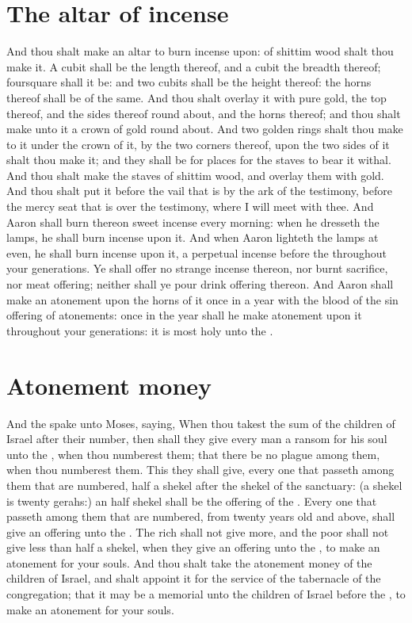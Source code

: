 \section*{The altar of incense}
\begin{biblechapter} %
\verse And thou shalt make an altar to burn incense upon: of shittim wood shalt thou make it.
\verse A cubit shall be the length thereof, and a cubit the breadth thereof; foursquare shall it be: and two cubits shall be the height thereof: the horns thereof shall be of the same.
\verse And thou shalt overlay it with pure gold, the top thereof, and the sides thereof round about, and the horns thereof; and thou shalt make unto it a crown of gold round about.
\verse And two golden rings shalt thou make to it under the crown of it, by the two corners thereof, upon the two sides of it shalt thou make it; and they shall be for places for the staves to bear it withal.
\verse And thou shalt make the staves of shittim wood, and overlay them with gold.
\verse And thou shalt put it before the vail that is by the ark of the testimony, before the mercy seat that is over the testimony, where I will meet with thee.
\verse And Aaron shall burn thereon sweet incense every morning: when he dresseth the lamps, he shall burn incense upon it.
\verse And when Aaron lighteth the lamps at even, he shall burn incense upon it, a perpetual incense before the \LORD throughout your generations.
\verse Ye shall offer no strange incense thereon, nor burnt sacrifice, nor meat offering; neither shall ye pour drink offering thereon.
\verse And Aaron shall make an atonement upon the horns of it once in a year with the blood of the sin offering of atonements: once in the year shall he make atonement upon it throughout your generations: it is most holy unto the \LORD.
\section*{Atonement money}
\verse And the \LORD spake unto Moses, saying,
\verse When thou takest the sum of the children of Israel after their number, then shall they give every man a ransom for his soul unto the \LORD, when thou numberest them; that there be no plague among them, when thou numberest them.
\verse This they shall give, every one that passeth among them that are numbered, half a shekel after the shekel of the sanctuary: (a shekel is twenty gerahs:) an half shekel shall be the offering of the \LORD.
\verse Every one that passeth among them that are numbered, from twenty years old and above, shall give an offering unto the \LORD.
\verse The rich shall not give more, and the poor shall not give less than half a shekel, when they give an offering unto the \LORD, to make an atonement for your souls.
\verse And thou shalt take the atonement money of the children of Israel, and shalt appoint it for the service of the tabernacle of the congregation; that it may be a memorial unto the children of Israel before the \LORD, to make an atonement for your souls.

\end{biblechapter}
